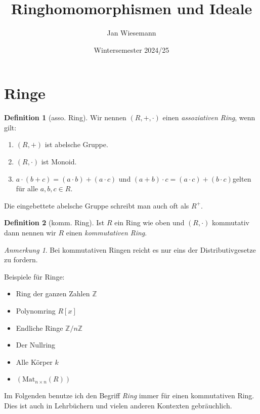 \documentclass{article}
\theoremstyle{definition}
\newtheorem*{definition}{Definition}
\theoremstyle{remark}
\newtheorem*{anm}{Anmerkung}
\begin{document}
\title{\bf{Ringhomomorphismen und Ideale}}
\author{Jan Wiesemann}
\date{Wintersemester 2024/25}
\maketitle

\section{Ringe}

\begin{definition}[asso. Ring] Wir nennen $(R,+,\cdot)$ einen \emph{assoziativen Ring}, wenn gilt:
\begin{enumerate}[label=(\roman*)]
    \item $(R,+)$ ist abelsche Gruppe.
    \item $(R,\cdot)$ ist Monoid.
    \item $a\cdot(b+c)=(a\cdot b)+(a\cdot c)$ und $(a+b)\cdot c=(a\cdot c)+(b\cdot c)$gelten für alle
        $a,b,c\in R$.
\end{enumerate}
\end{definition}

Die eingebettete abelsche Gruppe schreibt man auch oft als $R^+$.

\begin{definition}[komm. Ring] Ist $R$ ein Ring wie oben und $(R,\cdot)$ kommutativ dann nennen wir $R$
    einen \emph{kommutativen Ring}.
\end{definition}

\begin{anm} Bei kommutativen Ringen reicht es nur eins der Distributivgesetze zu fordern.
\end{anm}

Beispiele für Ringe: \begin{itemize}
    \item Ring der ganzen Zahlen $\mathbb{Z}$
    \item Polynomring $R[x]$
    \item Endliche Ringe $\mathbb{Z}\slash n\mathbb{Z}$
    \item Der Nullring
    \item Alle Körper $k$
    \item $(\text{Mat}_{n\times n}(R))$
\end{itemize}

Im Folgenden benutze ich den Begriff \emph{Ring} immer für einen kommutativen Ring.
Dies ist auch in Lehrbüchern und vielen anderen Kontexten gebräuchlich.
\end{document}
